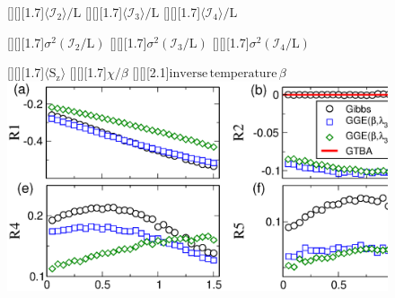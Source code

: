 \documentclass[12pt]{article}
\begin{document}

\begin{figure}
[][][1.7]{$\langle{\mathcal I}_2\rangle/\mathrm{L}$}
[][][1.7]{$\langle{\mathcal I}_3\rangle/\mathrm{L}$}
[][][1.7]{$\langle{\mathcal I}_4\rangle/\mathrm{L}$}

[][][1.7]{$\sigma^2({\mathcal I}_2/\mathrm{L})$}
[][][1.7]{$\sigma^2({\mathcal I}_3/\mathrm{L})$}
[][][1.7]{$\sigma^2({\mathcal I}_4/\mathrm{L})$}

[][][1.7]{$\langle \mathrm{S_z}\rangle$}
[][][1.7]{$\chi/\beta$}
[][][2.1]{$\mathrm{inverse}\, \mathrm{temperature}\, \beta$}
\includegraphics{fig1.eps}
\end{figure}
\end{document}
